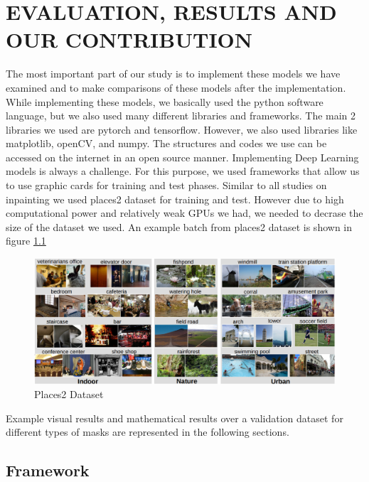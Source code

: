 \chapter{EVALUATION, RESULTS AND OUR CONTRIBUTION }\label{our_work}

The most important part of our study is to implement these models we have examined and to make comparisons of these models after the implementation. While implementing these models, we basically used the python software language, but we also used many different libraries and frameworks. The main 2 libraries we used are pytorch and tensorflow. However, we also used libraries like matplotlib, openCV, and numpy. The structures and codes we use can be accessed on the internet in an open source manner.
\newline
Implementing Deep Learning models is always a challenge. For this purpose, we used frameworks that allow us to use graphic cards for training and test phases. Similar to all studies on inpainting we used places2 dataset \cite{dataset_places} for training and test. However due to high computational power and relatively weak GPUs we had, we needed to decrase the size of the dataset we used. An example batch from places2 dataset is shown in figure \ref{fig:dataset}

\begin{figure}[h!]
    \centering
    \includegraphics[scale=0.45]{figures/chapter5/Places2Dataset.PNG}
    \vspace*{4mm}
    \caption{Places2 Dataset \cite{dataset_places}}
    \label{fig:dataset}
\end{figure}

Example visual results and mathematical results over a validation dataset for different types of masks are represented in the following sections.  
\newpage
\section{Framework}

